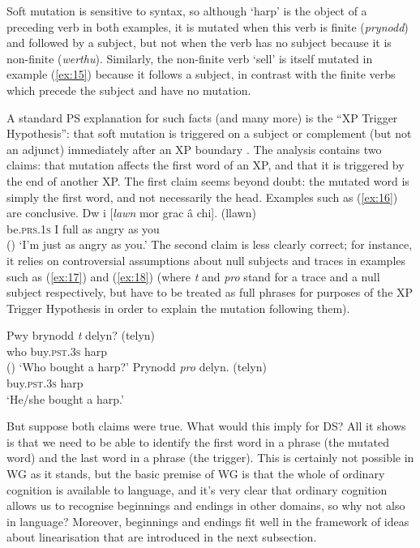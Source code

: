 \documentclass[output=paper,biblatex,babelshorthands,newtxmath,draftmode,colorlinks,citecolor=brown]{langscibook}
\begin{document}
\noindent
Soft mutation is sensitive to syntax, so although `harp' is the object of a preceding verb in both
examples, it is mutated when this verb is finite (\emph{prynodd}) and followed by a subject, but not
when the verb has no subject because it is non-finite (\emph{werthu}). Similarly, the non-finite
verb `sell' is itself mutated in example (\ref{ex:15}) because it follows a subject, in contrast
with the finite verbs which precede the subject and have no mutation.

A standard PS explanation for such facts (and many more) is the ``XP Trigger Hypothesis'': that soft
mutation is triggered on a subject or complement (but not an adjunct) immediately after an XP
boundary \citep[226]{BorsleyTallermanWillis2007}. The analysis contains two claims: that mutation
affects the first word of an XP, and that it is triggered by the end of another XP. The first claim
seems beyond doubt: the mutated word is simply the first word, and not necessarily the
head. Examples such as (\ref{ex:16}) are conclusive.
%
\ea
\label{ex:16}
\gll Dw                          i [\emph{lawn}   mor grac  â  chi]. (llawn)\\
     be.\textsc{prs}.1\textsc{s} I \spacebr{}full as  angry as you\\\hfill()
\glt `I'm just as angry as you.'
\z
%
\noindent
The second claim is less clearly correct; for instance, it relies on controversial assumptions about
null subjects and traces in examples such as (\ref{ex:17}) and (\ref{ex:18}) (where \emph{t} and
\emph{pro} stand for a trace and a null subject respectively, but have to be treated as full phrases
for purposes of the XP Trigger Hypothesis in order to explain the mutation following them).
%
\begin{exe}
\ex \label{ex:17}
\gll Pwy brynodd \emph{t} delyn? (telyn)\\
     who buy.\textsc{pst}.3\textsc{s} {} harp\\\hfill()
\glt `Who bought a harp?'
\ex \label{ex:18}
\gll Prynodd \emph{pro} delyn. (telyn)\\
     buy.\textsc{pst}.3\textsc{s} {} harp\\
\glt `He/she bought a harp.'
\end{exe}
%
\noindent
But suppose both claims were true. What would this imply for DS? All it shows is that we need to be
able to identify the first word in a phrase (the mutated word) and the last word in a phrase (the
trigger). This is certainly not possible in WG as it stands, but the basic premise of WG is that the
whole of ordinary cognition is available to language, and it's very clear that ordinary cognition
allows us to recognise beginnings and endings in other domains, so why not also in language?
Moreover, beginnings and endings fit well in the framework of ideas about linearisation that are
introduced in the next subsection.
\end{document}
